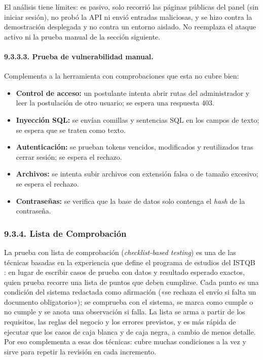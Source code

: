El análisis tiene límites: es pasivo, solo recorrió las páginas públicas del panel (sin iniciar sesión), no probó la API ni envió entradas maliciosas, y se hizo contra la demostración desplegada y no contra un entorno aislado. No reemplaza el ataque activo ni la prueba manual de la sección siguiente.

\paragraph{9.3.3.3. Prueba de vulnerabilidad manual.}

Complementa a la herramienta con comprobaciones que esta no cubre bien:

\begin{itemize}
    \item \textbf{Control de acceso:} un postulante intenta abrir rutas del administrador y leer la postulación de otro usuario; se espera una respuesta 403.
    \item \textbf{Inyección SQL:} se envían comillas y sentencias SQL en los campos de texto; se espera que se traten como texto.
    \item \textbf{Autenticación:} se prueban tokens vencidos, modificados y reutilizados tras cerrar sesión; se espera el rechazo.
    \item \textbf{Archivos:} se intenta subir archivos con extensión falsa o de tamaño excesivo; se espera el rechazo.
    \item \textbf{Contraseñas:} se verifica que la base de datos solo contenga el \textit{hash} de la contraseña.
\end{itemize}

\subsubsection{9.3.4. Lista de Comprobación}

La prueba con lista de comprobación (\textit{checklist-based testing}) es una de las técnicas basadas en la experiencia que define el programa de estudios del ISTQB \parencite{istqb2023ctfl}: en lugar de escribir casos de prueba con datos y resultado esperado exactos, quien prueba recorre una lista de puntos que deben cumplirse. Cada punto es una condición del sistema redactada como afirmación («se rechaza el envío si falta un documento obligatorio»); se comprueba con el sistema, se marca como cumple o no cumple y se anota una observación si falla. La lista se arma a partir de los requisitos, las reglas del negocio y los errores previstos, y es más rápida de ejecutar que los casos de caja blanca y de caja negra, a cambio de menos detalle. Por eso complementa a esas dos técnicas: cubre muchas condiciones a la vez y sirve para repetir la revisión en cada incremento.

